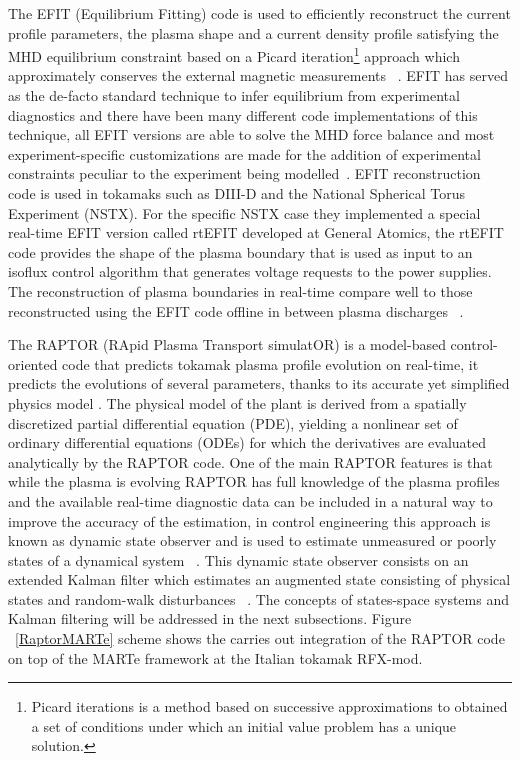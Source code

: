 The EFIT (Equilibrium Fitting) code is used to efficiently reconstruct the current profile parameters, the plasma shape  and a current density profile satisfying the MHD equilibrium constraint  based on a Picard iteration\footnote{Picard iterations is a method based on  successive approximations to obtained a set of conditions under which an initial value problem has a unique solution.} approach which approximately conserves the external magnetic measurements ~\cite{EFIT1985}. EFIT has served as the de-facto standard technique to infer equilibrium from experimental diagnostics and there have been many different code implementations of this technique, all EFIT versions  are able to solve the MHD force balance and most experiment-specific customizations are made for the addition of experimental constraints peculiar to the experiment being modelled~\cite{EFIT2013}. EFIT reconstruction code is used in tokamaks such as DIII-D and the National Spherical Torus Experiment (NSTX). For the specific NSTX case they implemented a special real-time EFIT version called rtEFIT developed at General Atomics, the rtEFIT code provides the shape of the plasma boundary that is used as input to an isoflux control algorithm that generates voltage requests to the power supplies. The reconstruction of plasma boundaries  in real-time compare well to those reconstructed using the EFIT code offline in between plasma discharges ~\cite{rtEFIT}.
\smallskip


The RAPTOR (RApid Plasma Transport simulatOR)  is a model-based control-oriented code that predicts tokamak plasma profile evolution on real-time, it predicts the evolutions of several parameters, thanks to its accurate yet simplified physics model \cite{Raptor}. The physical model of the plant is derived from a spatially discretized partial differential equation (PDE), yielding a nonlinear set of ordinary differential equations (ODEs) for which the derivatives are evaluated analytically by the RAPTOR code. One of the main RAPTOR features is that  while the plasma is evolving RAPTOR has full knowledge of the plasma profiles and the available real-time diagnostic data can be included in a natural way to improve the accuracy of the estimation, in control engineering this approach is known as dynamic state observer and is used to estimate unmeasured or  poorly states of a dynamical system ~\cite{RAPTOR2011}. This dynamic state observer consists on an extended Kalman filter which estimates an augmented state consisting of physical states and random-walk disturbances  ~\cite{RAPTOR2014}. The concepts of  states-space systems and Kalman filtering will be addressed in the next subsections.  Figure ~\ref{RaptorMARTe} scheme shows  the carries out  integration of the RAPTOR code on top of the MARTe framework at the Italian tokamak RFX-mod.
\smallskip

